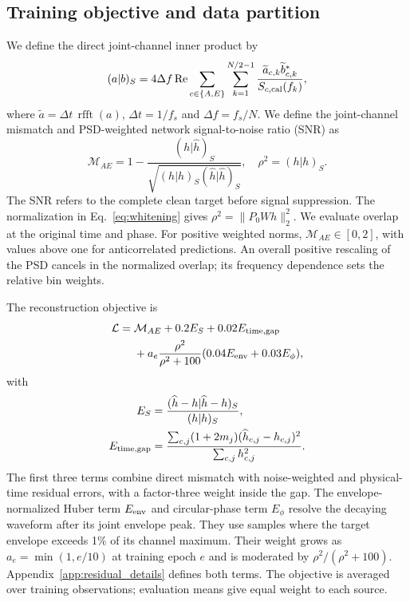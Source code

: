 \documentclass[10pt,prd,aps,a4paper,twocolumn,superscriptaddress,nofootinbib,floatfix]{revtex4-2}
\begin{document}
\subsection{Training objective and data partition}\label{loss}
We define the direct joint-channel inner product by
\begin{equation}
(a|b)_S=4\Delta f\operatorname{Re}
\sum_{c\in\{A,E\}}\sum_{k=1}^{N/2-1}
\frac{\widetilde a_{c,k}\widetilde b_{c,k}^{*}}{S_{c,\rm cal}(f_k)},\label{eq:joint_inner}
\end{equation}
where $\widetilde a=\Delta t\,\operatorname{rfft}(a)$, $\Delta t=1/f_s$ and $\Delta f=f_s/N$. We define the joint-channel mismatch and PSD-weighted network signal-to-noise ratio (SNR) as
\begin{equation}
\mathcal M_{AE}=1-\frac{(h|\widehat h)_S}{\sqrt{(h|h)_S(\widehat h|\widehat h)_S}},\quad
\rho^2=(h|h)_S.\label{eq:joint_mismatch}
\end{equation}
The SNR refers to the complete clean target before signal suppression. The normalization in Eq.~\eqref{eq:whitening} gives $\rho^2=\|P_0Wh\|_2^2$. We evaluate overlap at the original time and phase. For positive weighted norms, $\mathcal M_{AE}\in[0,2]$, with values above one for anticorrelated predictions. An overall positive rescaling of the PSD cancels in the normalized overlap; its frequency dependence sets the relative bin weights.

The reconstruction objective is
\begin{equation}
\begin{split}
\mathcal L={}&\mathcal M_{AE}+0.2E_S+0.02E_{\rm time,gap}\\
&+a_e\frac{\rho^2}{\rho^2+100}(0.04E_{\rm env}+0.03E_\phi),
\end{split}\label{eq:loss}
\end{equation}
with
\begin{align}
E_S&=\frac{(\widehat h-h|\widehat h-h)_S}{(h|h)_S},\nonumber\\
E_{\rm time,gap}&=\frac{\sum_{c,j}(1+2m_j)(\widehat h_{c,j}-h_{c,j})^2}{\sum_{c,j}h_{c,j}^2}.\label{eq:auxiliary_errors}
\end{align}
The first three terms combine direct mismatch with noise-weighted and physical-time residual errors, with a factor-three weight inside the gap. The envelope-normalized Huber term $E_{\rm env}$ and circular-phase term $E_\phi$ resolve the decaying waveform after its joint envelope peak. They use samples where the target envelope exceeds 1\% of its channel maximum. Their weight grows as $a_e=\min(1,e/10)$ at training epoch $e$ and is moderated by $\rho^2/(\rho^2+100)$. Appendix~\ref{app:residual_details} defines both terms. The objective is averaged over training observations; evaluation means give equal weight to each source.
\end{document}
